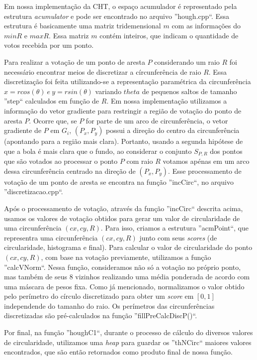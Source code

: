 \documentclass[11pt,a4paper]{article}
\begin{document}
 Em nossa implementação da CHT, o espaço acumulador é representado pela estrutura \textit{acumulator} e pode ser encontrado no arquivo ''hough.cpp``. Essa estrutura é basicamente uma matriz tridemensional $m$ com as informações do $minR$ e $maxR$. Essa matriz $m$ contém inteiros, que indicam o quantidade de votos recebida por um ponto. 

 Para realizar a votação de um ponto de aresta $P$ considerando um raio $R$ foi necessário encontrar meios de discretizar a círcunferência de raio $R$. Essa discretização foi feita utilizando-se a representação paramétrica da circunferência $x = rcos(\theta) ~e~ y = rsin(\theta)$ variando $theta$ de pequenos saltos de tamanho ''step`` calculados em função de $R$. Em nossa implementação utilizamos a informação do vetor gradiente para restringir a região de votação do ponto de aresta $P$. Ocorre que, se $P$ for parte de um arco de circunferência, o vetor gradiente de $P$ em $G_i$, $(P_x,P_y)$ possui a direção do centro da circunferência (apontando para a região mais clara). Portanto, usando a segunda hipótese de que a bola é mais clara que o fundo, ao considerar o conjunto $S_{P,R}$ dos pontos que são votados ao processar o ponto $P$ com raio $R$ votamos apénas em um arco dessa circunferência centrado na direção de $(P_x,P_y)$. Esse processamento de votação de um ponto de aresta se encontra na função ''incCirc``, no arquivo ''discretizacao.cpp``.

 Após o processamento de votação, através da função ''incCirc`` descrita acima, usamos os valores de votação obtidos para gerar um valor de circularidade de uma circunferência $(cx,cy,R)$. Para isso, criamos a estrutura ''acmPoint``, que representra uma circunferência $(cx,cy,R)$ junto com seus \textit{scores} (de circularidade, histograma e final). Para calcular o valor de circularidade do ponto $(cx,cy,R)$, com base na votação previamente, utilizamos a função ''calcVNorm``. Nessa função, consideramos não só a votação no próprio ponto, mas também de seus 8 vizinhos realizando uma média ponderada de acordo com uma máscara de pesos fixa. Como já mencionado, normalizamos o valor obtido pelo perímetro do círculo discretizado para obter um \textit{score} em $[0,1]$ independende do tamanho do raio. Os perímetros das circunferências discretizadas são pré-calculados na função ''fillPreCalcDiscP()``.

Por final, na função ''houghC1``, durante o processo de cálculo do diversos valores de circularidade, utilizamos uma \textit{heap} para guardar os ''thNCirc`` maiores valores encontrados, que são então retornados como produto final de nossa função.
\end{document}
